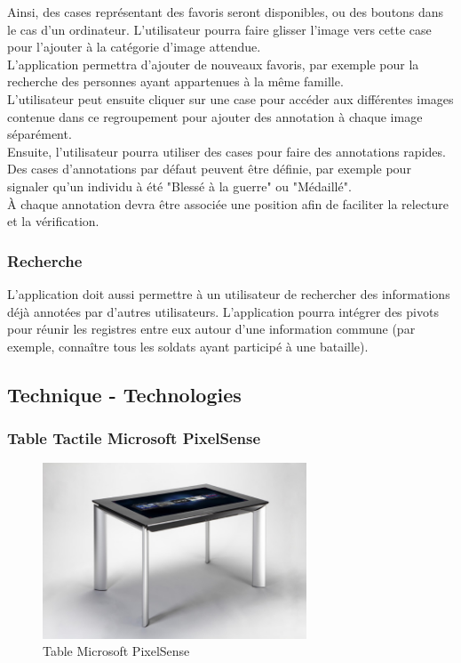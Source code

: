 \documentclass[a4paper]{article}
\begin{document}
	Ainsi, des cases repr\'esentant des favoris seront disponibles, ou des boutons dans le cas d'un ordinateur. L'utilisateur pourra faire glisser l'image vers cette case pour l'ajouter \`a la cat\'egorie d'image attendue. \\
    
    L'application permettra d'ajouter de nouveaux favoris, par exemple pour la recherche des personnes ayant appartenues \`a la m\^eme famille.\\
    
    L'utilisateur peut ensuite cliquer sur une case pour acc\'eder aux diff\'erentes images contenue dans ce regroupement pour ajouter des annotation \`a chaque image s\'epar\'ement.\\
    
   	Ensuite, l'utilisateur pourra utiliser des cases pour faire des annotations rapides. Des cases d'annotations par d\'efaut peuvent \^etre d\'efinie, par exemple pour signaler qu'un individu \`a \'et\'e "Bless\'e \`a la guerre" ou "M\'edaill\'e".\\
    
	\`A chaque annotation devra \^etre associ\'ee une position afin de faciliter la relecture et la v\'erification.\\

\subsubsection{Recherche}

	L'application doit aussi permettre \`a un utilisateur de rechercher des informations d\'ej\`a annot\'ees par d'autres utilisateurs. L'application pourra int\'egrer des pivots pour r\'eunir les registres entre eux autour d'une information commune (par exemple, conna\^itre tous les soldats ayant particip\'e \`a une bataille).

\subsection{Technique - Technologies}
\label{subsec:techno}

\subsubsection{Table Tactile Microsoft PixelSense}
\label{subsubsec:tabletactile}

\begin{figure}[H]
\centering
\includegraphics[width=0.7\textwidth]{coffee-tables.png}
\caption{\label{fig:pixelSense}Table Microsoft PixelSense}
\end{figure}
    
\end{document}
